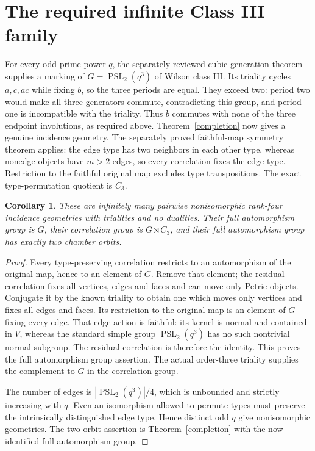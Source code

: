 \documentclass[11pt,a4paper]{article}
\newtheorem{corollary}[lemma]{Corollary}
\newcommand{\PSL}{\operatorname{PSL}}
\begin{document}
\section{The required infinite Class III family}
For every odd prime power $q$, the separately reviewed cubic
generation theorem supplies a marking of $G=\PSL_2(q^3)$ of
Wilson class III. Its triality cycles $a,c,ac$ while fixing $b$,
so the three periods are equal. They exceed two: period two would
make all three generators commute, contradicting this group, and
period one is incompatible with the triality. Thus $b$ commutes
with none of the three endpoint involutions, as required above.
Theorem~\ref{completion} now gives a genuine incidence geometry.
The separately proved faithful-map symmetry theorem applies: the
edge type has two neighbors in each other type, whereas nonedge
objects have $m>2$ edges, so every correlation fixes the edge type.
Restriction to the faithful original map excludes type transpositions.
The exact type-permutation quotient is $C_3$.

\begin{corollary}
These are infinitely many pairwise nonisomorphic rank-four incidence
geometries with trialities and no dualities. Their full automorphism
group is $G$, their correlation group is $G\rtimes C_3$, and their
full automorphism group has exactly two chamber orbits.
\end{corollary}
\begin{proof}
Every type-preserving correlation restricts to an automorphism of
the original map, hence to an element of $G$. Remove that element;
the residual correlation fixes all vertices, edges and faces and
can move only Petrie objects. Conjugate it by the known triality
to obtain one which moves only vertices and fixes all edges and
faces. Its restriction to the original map is an element of $G$
fixing every edge. That edge action is faithful: its kernel is
normal and contained in $V$, whereas the standard simple group
$\PSL_2(q^3)$ has no such nontrivial normal subgroup.
The residual correlation is therefore the identity. This proves
the full automorphism group assertion. The actual order-three
triality supplies the complement to $G$ in the correlation group.

The number of edges is $|\PSL_2(q^3)|/4$, which is unbounded
and strictly increasing with $q$. Even an isomorphism allowed to
permute types must preserve the intrinsically distinguished edge
type. Hence distinct odd $q$ give nonisomorphic geometries.
The two-orbit assertion is Theorem~\ref{completion} with the now
identified full automorphism group.
\end{proof}
\end{document}
